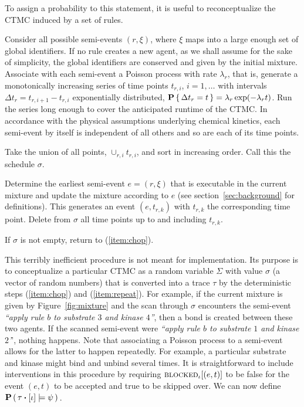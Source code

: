 To assign a probability to this statement, it is useful to reconceptualize 
the CTMC induced by a set of rules.
\begin{inparaenum}[(i)]
\item \label{item:poisson}
Consider all possible semi-events $(r, \xi)$, where $\xi$ maps into a large enough set of global identifiers. If no rule creates a new agent, as we shall assume for the sake of simplicity, the global identifiers are conserved and given by the initial mixture. Associate with each semi-event a Poisson process with rate $\lambda_r$, that is, generate a monotonically increasing series of time points $t_{r,i}$, $i=1,\ldots$ with intervals $\Delta t_r=t_{r,i+1}-t_{r,i}$ exponentially distributed, $\mathbf{P} \left\{\, \Delta t_r=t \,\right\}=\lambda_r\exp(-\lambda_r t)$. Run the series long enough to cover the anticipated runtime of the CTMC. In accordance with the physical assumptions underlying chemical kinetics, each semi-event by itself is independent of all others and so are each of its time points. 
\item \label{item:union}
Take the union of all points, $\cup_{r,i}t_{r,i}$, and sort in increasing order. Call this the schedule $\sigma$. 
\item \label{item:chop}
Determine the earliest semi-event $e=(r, \xi)$ that is executable in the current mixture and update the mixture according to $e$ (see section~\ref{sec:background} for definitions). This generates an event $(e, t_{r,k})$ with $t_{r,k}$ the corresponding time point. Delete from $\sigma$ all time points up to and including $t_{r,k}$. 
\item \label{item:repeat}
If $\sigma$ is not empty, return to (\ref{item:chop}). 
\end{inparaenum}
This terribly inefficient procedure is not meant for implementation. Its purpose is to conceptualize a particular CTMC as a random variable $\Sigma$ with value $\sigma$ (a vector of random numbers) that is converted into a trace $\tau$ by the deterministic steps (\ref{item:chop}) and (\ref{item:repeat}). For example, if the current mixture is given by Figure~\ref{fig:mixture} and the scan through $\sigma$ encounters the semi-event \emph{``apply rule $b$ to substrate $3$ and kinase $4$''}, then a bond is created between these two agents. If the scanned semi-event were \emph{``apply rule $b$ to substrate $1$ and kinase $2$'}', nothing happens. Note that associating a Poisson process to a semi-event allows for the latter to happen repeatedly. For example, a particular substrate and kinase might bind and unbind several times. It is straightforward to include interventions in this procedure by requiring  ${\textsc{blocked}}_{\iota}[(e, t)]$ to be false for the event $(e,t)$ to be accepted and true to be skipped over. We can now define $\PCFST{}$.
